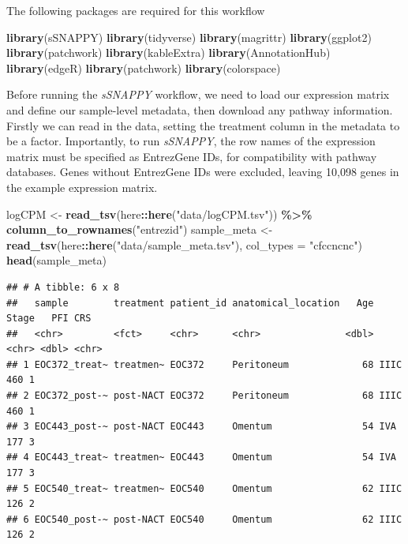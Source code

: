 \documentclass[9pt,a4paper,]{extarticle}
\newenvironment{Shaded}{\begin{snugshade}}{\end{snugshade}}
\newcommand{\AttributeTok}[1]{\textcolor[rgb]{0.13,0.29,0.53}{#1}}
\newcommand{\FunctionTok}[1]{\textcolor[rgb]{0.13,0.29,0.53}{\textbf{#1}}}
\newcommand{\NormalTok}[1]{#1}
\newcommand{\OtherTok}[1]{\textcolor[rgb]{0.56,0.35,0.01}{#1}}
\newcommand{\SpecialCharTok}[1]{\textcolor[rgb]{0.81,0.36,0.00}{\textbf{#1}}}
\newcommand{\StringTok}[1]{\textcolor[rgb]{0.31,0.60,0.02}{#1}}
\begin{document}
The following packages are required for this workflow

\begin{Shaded}
\begin{Highlighting}[]
\FunctionTok{library}\NormalTok{(sSNAPPY)}
\FunctionTok{library}\NormalTok{(tidyverse)}
\FunctionTok{library}\NormalTok{(magrittr)}
\FunctionTok{library}\NormalTok{(ggplot2)}
\FunctionTok{library}\NormalTok{(patchwork)}
\FunctionTok{library}\NormalTok{(kableExtra)}
\FunctionTok{library}\NormalTok{(AnnotationHub) }
\FunctionTok{library}\NormalTok{(edgeR)}
\FunctionTok{library}\NormalTok{(patchwork)}
\FunctionTok{library}\NormalTok{(colorspace)}
\end{Highlighting}
\end{Shaded}

Before running the \emph{sSNAPPY} workflow, we need to load our expression matrix and define our sample-level metadata, then download any pathway information.
Firstly we can read in the data, setting the treatment column in the metadata to be a factor.
Importantly, to run \emph{sSNAPPY}, the row names of the expression matrix must be specified as EntrezGene IDs, for compatibility with pathway databases.
Genes without EntrezGene IDs were excluded, leaving 10,098 genes in the example expression matrix.

\begin{Shaded}
\begin{Highlighting}[]
\NormalTok{logCPM }\OtherTok{\textless{}{-}} \FunctionTok{read\_tsv}\NormalTok{(here}\SpecialCharTok{::}\FunctionTok{here}\NormalTok{(}\StringTok{"data/logCPM.tsv"}\NormalTok{)) }\SpecialCharTok{\%\textgreater{}\%}
    \FunctionTok{column\_to\_rownames}\NormalTok{(}\StringTok{"entrezid"}\NormalTok{)}
\NormalTok{sample\_meta }\OtherTok{\textless{}{-}} \FunctionTok{read\_tsv}\NormalTok{(here}\SpecialCharTok{::}\FunctionTok{here}\NormalTok{(}\StringTok{"data/sample\_meta.tsv"}\NormalTok{), }\AttributeTok{col\_types =} \StringTok{"cfccncnc"}\NormalTok{)}
\FunctionTok{head}\NormalTok{(sample\_meta)}
\end{Highlighting}
\end{Shaded}

\begin{verbatim}
## # A tibble: 6 x 8
##   sample        treatment patient_id anatomical_location   Age Stage   PFI CRS  
##   <chr>         <fct>     <chr>      <chr>               <dbl> <chr> <dbl> <chr>
## 1 EOC372_treat~ treatmen~ EOC372     Peritoneum             68 IIIC    460 1    
## 2 EOC372_post-~ post-NACT EOC372     Peritoneum             68 IIIC    460 1    
## 3 EOC443_post-~ post-NACT EOC443     Omentum                54 IVA     177 3    
## 4 EOC443_treat~ treatmen~ EOC443     Omentum                54 IVA     177 3    
## 5 EOC540_treat~ treatmen~ EOC540     Omentum                62 IIIC    126 2    
## 6 EOC540_post-~ post-NACT EOC540     Omentum                62 IIIC    126 2
\end{verbatim}
\end{document}
